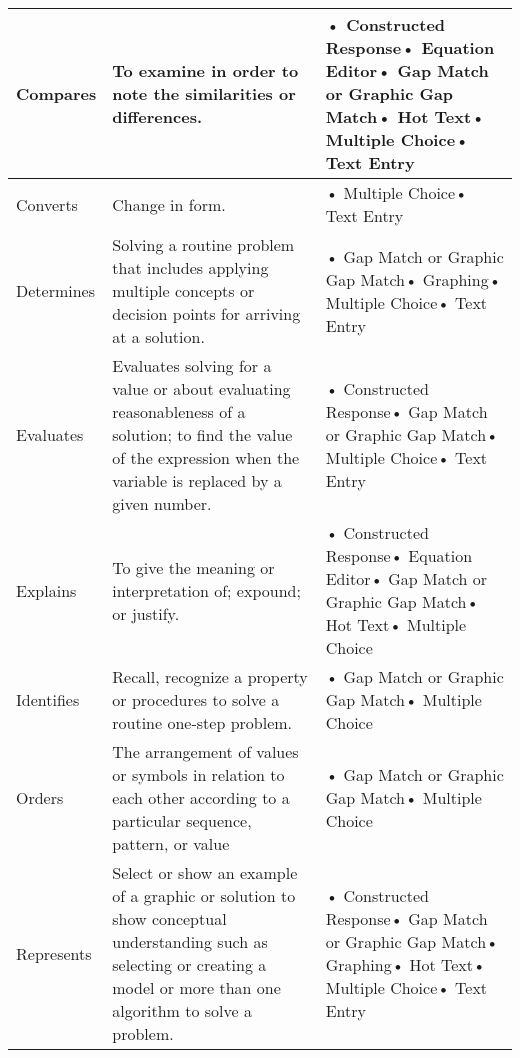 \documentclass[11pt, English]{article}
\begin{document}
\begin{longtable}{|p{1.8cm}|p{6.0cm}|p{8.7cm}|}
 Compares & To examine in order to note the similarities or differences. & • Constructed Response\newline• Equation Editor\newline• Gap Match or Graphic Gap Match\newline• Hot Text\newline• Multiple Choice\newline• Text Entry\\
 \hline
	  Converts & Change in form. & • Multiple Choice\newline• Text Entry\\
 \hline
	  Determines & Solving a routine problem that includes applying multiple concepts or decision points for arriving at a solution.  & • Gap Match or Graphic Gap Match\newline• Graphing\newline• Multiple Choice\newline• Text Entry\\
 \hline
	  Evaluates & Evaluates solving for  a value or about evaluating reasonableness of a solution;  to find the value of the expression when the variable is replaced by a given number.  & • Constructed Response\newline• Gap Match or Graphic Gap Match\newline• Multiple Choice\newline• Text Entry\\
 \hline
	  Explains & To give the meaning or interpretation of; expound; or justify. & • Constructed Response\newline• Equation Editor\newline• Gap Match or Graphic Gap Match\newline• Hot Text\newline• Multiple Choice\\
 \hline
	  Identifies & Recall, recognize a property or procedures to solve a routine one-step problem.  & • Gap Match or Graphic Gap Match\newline• Multiple Choice\\
 \hline
	  Orders & The arrangement of values or symbols in relation to each other according to a particular sequence, pattern, or value & • Gap Match or Graphic Gap Match\newline• Multiple Choice\\
 \hline
	  Represents & Select or show an example of a graphic or solution to show conceptual understanding such as selecting or creating a model or more than one algorithm to solve a problem. & • Constructed Response\newline• Gap Match or Graphic Gap Match\newline• Graphing\newline• Hot Text\newline• Multiple Choice\newline• Text Entry\\

\end{longtable}
\end{document}
